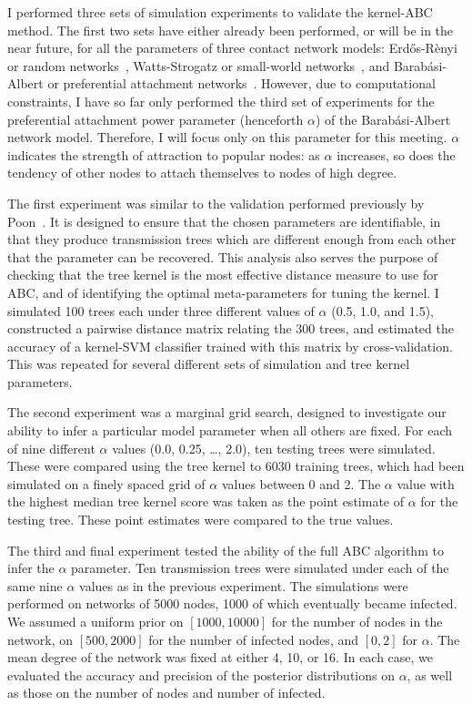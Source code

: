 \documentclass{article}
\begin{document}
I performed three sets of simulation experiments to validate the kernel-ABC
method. The first two sets have either already been performed, or will be in
the near future, for all the parameters of three contact network models:
Erd\H{o}s-R\`enyi or random networks~\autocite{erdos1960evolution},
Watts-Strogatz or small-world networks~\autocite{watts1998collective}, and
Barab\'asi-Albert or preferential attachment
networks~\autocite{barabasi1999emergence}. However, due to computational
constraints, I have so far only performed the third set of experiments for the
preferential attachment power parameter (henceforth $\alpha$) of the
Barab\'asi-Albert network model. Therefore, I will focus only on this parameter
for this meeting. $\alpha$ indicates the strength of attraction to popular
nodes: as $\alpha$ increases, so does the tendency of other nodes to attach
themselves to nodes of high degree.

The first experiment was similar to the validation performed previously by
Poon~\autocite{poon2015phylodynamic}. It is designed to ensure that the chosen
parameters are identifiable, in that they produce transmission trees which are
different enough from each other that the parameter can be recovered. This
analysis also serves the purpose of checking that the tree kernel is the most
effective distance measure to use for ABC, and of identifying the optimal
meta-parameters for tuning the kernel. I simulated 100 trees each under three
different values of $\alpha$ (0.5, 1.0, and 1.5), constructed a pairwise
distance matrix relating the 300 trees, and estimated the accuracy of a
kernel-SVM classifier trained with this matrix by cross-validation. This was
repeated for several different sets of simulation and tree kernel parameters.

The second experiment was a marginal grid search, designed to investigate our
ability to infer a particular model parameter when all others are fixed. For
each of nine different $\alpha$ values (0.0, 0.25, \ldots, 2.0), ten testing
trees were simulated. These were compared using the tree kernel to 6030
training trees, which had been simulated on a finely spaced grid of $\alpha$
values between 0 and 2. The $\alpha$ value with the highest median tree kernel
score was taken as the point estimate of $\alpha$ for the testing tree. These
point estimates were compared to the true values.

The third and final experiment tested the ability of the full ABC algorithm to
infer the $\alpha$ parameter. Ten transmission trees were simulated under each
of the same nine $\alpha$ values as in the previous experiment. The
simulations were performed on networks of 5000 nodes, 1000 of which eventually
became infected. We assumed a uniform prior on $[1000, 10000]$ for the number
of nodes in the network, on $[500, 2000]$ for the number of infected nodes, and
$[0, 2]$ for $\alpha$. The mean degree of the network was fixed at either 4,
10, or 16. In each case, we evaluated the accuracy and precision of the
posterior distributions on $\alpha$, as well as those on the number of nodes
and number of infected.
\end{document}
